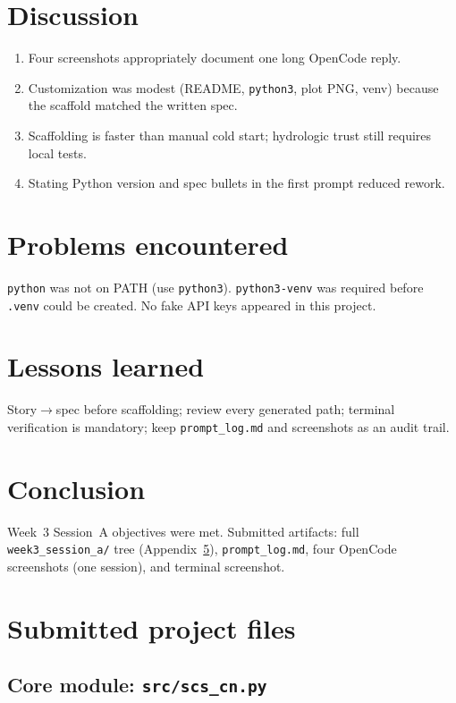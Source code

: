 \documentclass[11pt,a4paper]{article}
\newcommand{\LabCodeRoot}{week3_session_a_files}
\newcommand{\codebox}[3]{%
\begin{tcolorbox}[
  enhanced,
  colback=gray!6,
  colframe=black!55,
  title={#1},
  fonttitle=\bfseries\ttfamily\footnotesize,
  arc=1.5mm,
  boxrule=0.7pt,
  breakable,
  width=\linewidth,
  before skip=0.8em,
  after skip=0.8em,
]

\end{tcolorbox}%
}
\begin{document}
\section{Discussion}
\begin{enumerate}[noitemsep]
  \item Four screenshots appropriately document one long OpenCode reply.
  \item Customization was modest (README, \texttt{python3}, plot PNG, venv) because the scaffold matched the written spec.
  \item Scaffolding is faster than manual cold start; hydrologic trust still requires local tests.
  \item Stating Python version and spec bullets in the first prompt reduced rework.
\end{enumerate}

\section{Problems encountered}
\texttt{python} was not on PATH (use \texttt{python3}). \texttt{python3-venv} was required before \texttt{.venv} could be created. No fake API keys appeared in this project.

\section{Lessons learned}
Story$\rightarrow$spec before scaffolding; review every generated path; terminal verification is mandatory; keep \texttt{prompt\_log.md} and screenshots as an audit trail.

\section{Conclusion}
Week~3 Session~A objectives were met. Submitted artifacts: full \texttt{week3\_session\_a/} tree (Appendix~\ref{app:files}), \texttt{prompt\_log.md}, four OpenCode screenshots (one session), and terminal screenshot.

\appendix
\section{Submitted project files}
\label{app:files}

\subsection{Core module: \texttt{src/scs\_cn.py}}
\label{app:scs_cn}
\codebox{\texttt{src/scs\_cn.py} (full file)}{Python}{src/scs_cn.py}
\end{document}
